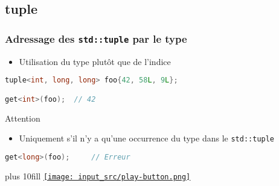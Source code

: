 \documentclass[C++.tex]{subfiles}
\begin{document}
\subsection*{tuple}
\begin{frame}[fragile]
	\frametitle{Adressage des \lstinline|std::tuple| par le type}
	\begin{itemize}
		\item Utilisation du type plutôt que de l'indice
	\end{itemize}

	\begin{lstlisting}[language=C++]
tuple<int, long, long> foo{42, 58L, 9L};

get<int>(foo);	// 42\end{lstlisting}

	\pause

	\begin{alertblock}{Attention}
		\begin{itemize}
			\item Uniquement s'il n'y a qu'une occurrence du type dans le \lstinline|std::tuple|
		\end{itemize}

		\begin{lstlisting}[language=C++]
get<long>(foo);     // Erreur\end{lstlisting}
	\end{alertblock}

	\vskip 10mm plus 10fill
	\hfill
	\href{https://godbolt.org/#g:!((g:!((g:!((h:codeEditor,i:(filename:'1',fontScale:14,fontUsePx:'0',j:1,lang:c%2B%2B,selection:(endColumn:1,endLineNumber:13,positionColumn:1,positionLineNumber:13,selectionStartColumn:1,selectionStartLineNumber:13,startColumn:1,startLineNumber:13),source:'%23include+%3Ciostream%3E%0A%23include+%3Ctuple%3E%0A%0Aint+main()%0A%7B%0A++std::tuple%3Cint,+long,+long%3E+foo%7B42,+58L,+9L%7D%3B%0A%0A++std::cout+%3C%3C+std::get%3Cint%3E(foo)+%3C%3C+!'%5Cn!'%3B%0A%23if+0%0A++std::cout+%3C%3C+std::get%3Clong%3E(foo)+%3C%3C+!'%5Cn!'%3B%0A%23endif%0A%7D%0A'),l:'5',n:'0',o:'C%2B%2B+source+%231',t:'0')),k:50,l:'4',n:'0',o:'',s:0,t:'0'),(g:!((h:executor,i:(argsPanelShown:'1',compilationPanelShown:'0',compiler:g112,compilerOutShown:'0',execArgs:'',execStdin:'',fontScale:14,fontUsePx:'0',j:1,lang:c%2B%2B,libs:!((name:boost,ver:'175')),options:'-std%3Dc%2B%2B14',source:1,stdinPanelShown:'1',tree:'1',wrap:'0'),l:'5',n:'0',o:'Executor+x86-64+gcc+11.2+(C%2B%2B,+Editor+%231)',t:'0')),header:(),k:50,l:'4',n:'0',o:'',s:0,t:'0')),l:'2',n:'0',o:'',t:'0')),version:4}{\texttt{[image: input\_src/play-button.png]}}
\end{frame}
\end{document}
